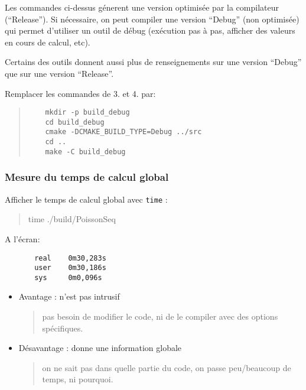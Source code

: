\documentclass{beamer}
\begin{document}
\begin{frame}[fragile]
\vfill
Les commandes ci-dessus g\'enerent une version optimis\'ee par la compilateur (``Release''). Si n\'ecessaire, on peut compiler une version ``Debug'' (non optimis\'ee)
qui permet d'utiliser un outil de d\'ebug (ex\'ecution pas \`a pas, afficher des valeurs en cours de calcul, etc).
\vfill

Certains des outils donnent aussi plus de renseignements sur une version ``Debug'' que sur une version ``Release''.
\vfill

Remplacer les commandes de 3. et 4. par:
	\begin{quote}
	\begin{verbatim}
	mkdir -p build_debug
	cd build_debug
	cmake -DCMAKE_BUILD_TYPE=Debug ../src
	cd ..
	make -C build_debug
	\end{verbatim}
\end{quote}
\vfill

\end{frame}

\begin{frame}[fragile]
	\frametitle{Mesure du temps de calcul global}
    \vfill
	Afficher le temps de calcul global avec {\tt time} :
		\begin{quote}
	       time ./build/PoissonSeq
        \end{quote}
	
	A l'\'ecran:\begin{minipage}[t]{4cm}
	\begin{verbatim}
	   real    0m30,283s
	   user    0m30,186s
	   sys     0m0,096s
	\end{verbatim}
	\end{minipage}

    \vfill
	\begin{itemize}
		\item Avantage : n'est pas intrusif
		\begin{quote}
			pas besoin de modifier le code, ni de le compiler avec des options sp\'ecifiques.
		\end{quote} 
		\item D\'esavantage : donne une information globale
		\begin{quote}
			on ne sait pas dans quelle partie du code, on passe peu/beaucoup de temps, ni pourquoi.
		\end{quote} 
	\end{itemize}
    \vfill
\end{frame}
\end{document}
